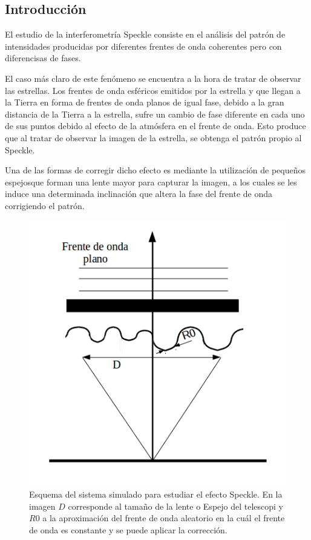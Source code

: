 \documentclass[twoside]{article}
\begin{document}
	\begin{multicols}{2} %

		\section{Introducción} %
							 
			El estudio de la interferometría Speckle consiste en el análisis del patrón de intensidades producidas por diferentes frentes de onda coherentes pero con diferencisas de fases.

			El caso más claro de este fenómeno se encuentra a la hora de tratar de observar las estrellas. Los frentes de onda esféricos emitidos por la estrella y que llegan a la Tierra en forma de frentes de onda planos de igual fase, debido a la gran distancia de la Tierra a la estrella, sufre un cambio de fase diferente en cada uno de sus puntos debido al efecto de la atmósfera en el frente de onda. Esto produce que al tratar de observar la imagen de la estrella, se obtenga el patrón propio al Speckle. 

			Una de las formas de corregir dicho efecto es mediante la utilización de pequeños espejosque forman una lente mayor para capturar la imagen, a los cuales se les induce una determinada inclinación que altera la fase del frente de onda corrigiendo el patrón.

				\begin{figure}[H]
					\centering
					\includegraphics[scale=0.25]{Esquema.png}
					\caption{\label{Img:Esquema}Esquema del sistema simulado para estudiar el efecto Speckle. En la imagen $D$ corresponde al tamaño de la lente o Espejo del telescopi y $R0$ a la aproximación del frente de onda aleatorio en la cuál el frente de onda es constante y se puede aplicar la corrección.}
				\end{figure}


\end{multicols}
\end{document}
